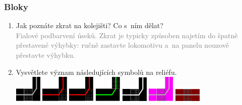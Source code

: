 \documentclass[12pt,a4paper]{article}
\newcommand{\solution}[1]{\\ \textcolor{gray}{#1}}
\newcommand{\solution}[1]{}
\begin{document}
\subsubsection*{Bloky}
\begin{enumerate}[leftmargin=*]
\item Jak poznáte zkrat na kolejišti? Co s~ním dělat?
\solution{Fialové podbarvení úseků. Zkrat je typicky způsoben najetím do špatně
přestavené výhybky: ručně zastavte lokomotivu a~na panelu nouzově přestavte
výhybku.}

\item Vysvětlete význam následujících symbolů na reliéfu. \\
\includegraphics[width=0.1\textwidth]{symboly/kol1.png}
\includegraphics[width=0.1\textwidth]{symboly/kol2.png}
\includegraphics[width=0.1\textwidth]{symboly/kol2.png}
\includegraphics[width=0.1\textwidth]{symboly/kol3.png}
\includegraphics[width=0.1\textwidth]{symboly/kol4.png}
\includegraphics[width=0.1\textwidth]{symboly/kol22.png}
\includegraphics[width=0.1\textwidth]{symboly/kol8.png}


\end{enumerate}
\end{document}
